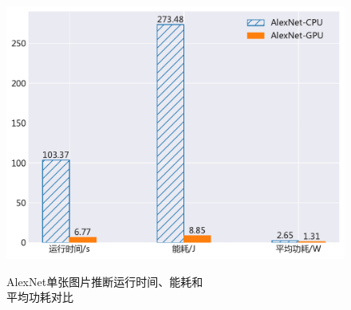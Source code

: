 \begin{figure}[htbp]
\begin{minipage}[b]{.6\linewidth}
    \begin{center}
    \includegraphics[height=0.65\textwidth]{figures/alexnet_energy.pdf}
    \end{center}
    \caption{AlexNet单张图片推断运行时间、能耗和 \\ 平均功耗对比}\label{figure:figure18}
\end{minipage}
\begin{minipage}[b]{.4\linewidth}
\centering
{}
\label{table:table8}
\end{minipage}
\end{figure}

%

